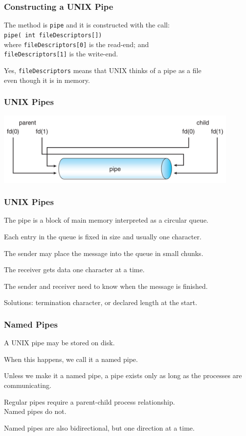 \begin{frame}
\frametitle{Constructing a UNIX Pipe}

The method is \texttt{pipe} and it is constructed with the call: \\
\texttt{pipe( int fileDescriptors[])}\\
\quad where \texttt{fileDescriptors[0]} is the read-end; and\\
\quad \texttt{fileDescriptors[1]} is the write-end. 

Yes, \texttt{fileDescriptors} means that UNIX thinks of a pipe as a file\\
\quad even though it is in memory.


\end{frame}

\begin{frame}
\frametitle{UNIX Pipes}

\begin{center}
	\includegraphics[width=0.9\textwidth]{images/unix-pipe.png}
\end{center}

\end{frame}

\begin{frame}
\frametitle{UNIX Pipes}

The pipe is a block of main memory interpreted as a circular queue.

Each entry in the queue is fixed in size and usually one character. 

The sender may place the message into the queue in small chunks.

The receiver gets data one character at a time. 

The sender and receiver need to know when the message is finished. 

Solutions: termination character, or declared length at the start.

\end{frame}

\begin{frame}
\frametitle{Named Pipes}

A UNIX pipe may be stored on disk. 

When this happens, we call it a \alert{named pipe}. 

Unless we make it a named pipe, a pipe exists only as long as the processes are communicating.

Regular pipes require a parent-child process relationship.\\
\quad Named pipes do not.

Named pipes are also bidirectional, but one direction at a time.

\end{frame}

